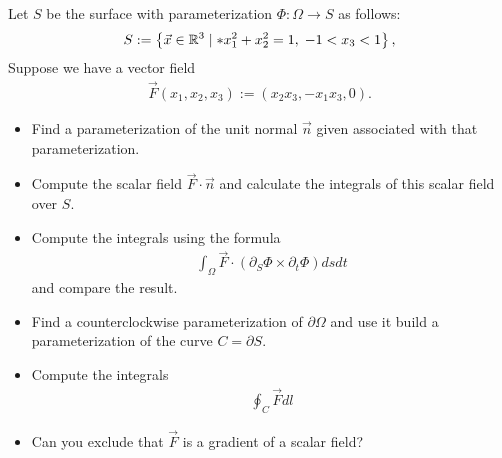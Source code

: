 \documentclass[11pt]{article}
\begin{document}
\begin{exercise}
    Let $S$ be the surface with parameterization $\Phi : \Omega \to S$ as follows:
    \begin{align}
     S := \left\{ \vec x \in \bbR^3 \suchthat* x_1^2 + x_2^2 = 1, \; -1 < x_3 < 1 \right\},
    \end{align}
    Suppose we have a vector field 
    \begin{align}
        \vec F(x_1,x_2,x_3) := (x_2 x_3, -x_1 x_3, 0 ).
    \end{align}
    \begin{itemize}
     \item
     Find a parameterization of the unit normal $\vec n$ given associated with that parameterization.
     \item
     Compute the scalar field $\vec F \cdot \vec n$ and calculate the integrals of this scalar field over $S$.
     \item
     Compute the integrals using the formula 
     \begin{align}
        \int_\Omega \vec F \cdot ( \partial_S \Phi \times \partial_t \Phi ) dsdt
     \end{align}
     and compare the result. 
     \item 
     Find a counterclockwise parameterization of $\partial\Omega$ and use it build a parameterization of the curve $C = \partial S$.
     \item 
     Compute the integrals 
     \begin{align}
        \oint_C \vec F dl
     \end{align}
     \item 
     Can you exclude that $\vec F$ is a gradient of a scalar field?
    \end{itemize}
\end{exercise}
\end{document}
